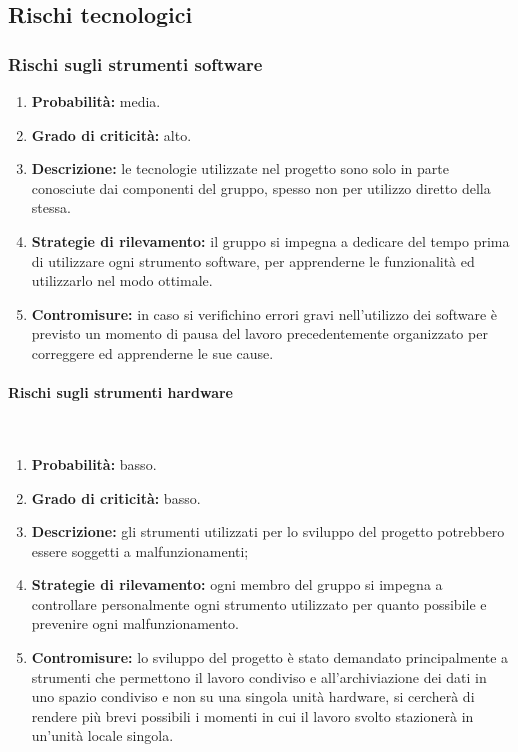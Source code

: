 \subsection{Rischi tecnologici}
\subsubsection{Rischi sugli strumenti software}
\begin{enumerate}
	\item \textbf{Probabilità:} media.
	\item \textbf{Grado di criticità:} alto.
	\item \textbf{Descrizione:} le tecnologie utilizzate nel progetto sono solo in parte conosciute dai componenti del gruppo, spesso non per utilizzo diretto della stessa.
	\item \textbf{Strategie di rilevamento:} il gruppo si impegna a dedicare del tempo prima di utilizzare ogni strumento software, per apprenderne le funzionalità ed utilizzarlo nel modo ottimale.
	\item \textbf{Contromisure:} in caso si verifichino errori gravi nell'utilizzo dei software è previsto un momento di pausa del lavoro precedentemente organizzato per correggere ed apprenderne le sue cause.
\end{enumerate}

\paragraph{Rischi sugli strumenti hardware}\mbox{}\\
\begin{enumerate}
	\item \textbf{Probabilità:} basso.
	\item \textbf{Grado di criticità:} basso.
	\item \textbf{Descrizione:} gli strumenti utilizzati per lo sviluppo del progetto potrebbero essere soggetti a malfunzionamenti;
	\item \textbf{Strategie di rilevamento:} ogni membro del gruppo si impegna a controllare personalmente ogni strumento utilizzato per quanto possibile e prevenire ogni malfunzionamento.
	\item \textbf{Contromisure:} lo sviluppo del progetto è stato demandato principalmente a strumenti che permettono il lavoro condiviso e all’archiviazione dei dati in uno spazio condiviso e non su una singola unità hardware, si cercherà di rendere più brevi possibili i momenti in cui il lavoro svolto stazionerà in un’unità locale singola.
\end{enumerate}

